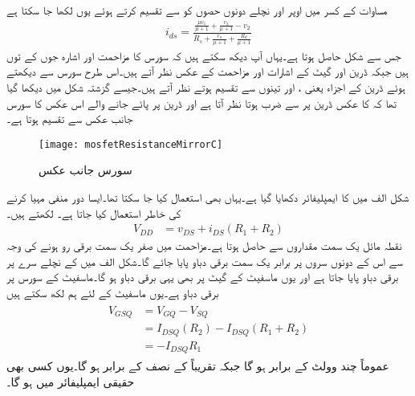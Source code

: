 مساوات  کے  کسر میں اوپر اور نچلے دونوں حصوں کو  سے تقسیم کرتے ہوئے یوں لکھا جا سکتا ہے
\begin{align}\label{مساوات_ماسفیٹ_محاصل_عکس_الف}
i_{ds}=\frac{\frac{\mu v_1}{\mu+1}+\frac{v_3}{\mu+1}- v_2}{R_s+\frac{r_o}{\mu+1}+\frac{R_d}{\mu+1}}
\end{align}
جس سے شکل  حاصل ہوتا ہے۔یہاں آپ دیکھ سکتے ہیں کہ سورس کا مزاحمت  اور اشارہ  جوں کے توں ہیں جبکہ ڈرین اور گیٹ کے اشارات اور مزاحمت کے عکس نظر آتے ہیں۔اس طرح سورس سے دیکھتے ہوئے ڈرین کے اجزاء یعنی ،  اور  تینوں  سے تقسیم ہوتے نظر آتے ہیں۔جیسے گزشتہ شکل میں دیکھا گیا تھا کہ  کا عکس ڈرین پر  سے ضرب ہوتا نظر آتا ہے اور ڈرین پر پائے جانے والے اس عکس کا سورس جانب عکس سے تقسیم ہوتا ہے۔
%
\begin{figure}
\centering
\texttt{[image: mosfetResistanceMirrorC]}
\caption{سورس جانب عکس}
\label{شکل_ماسفیٹ_مزاحمت_کے_عکس_پ}
\end{figure}
شکل  الف میں  کا  ایمپلیفائر دکھایا گیا ہے۔یہاں  بھی استعمال کیا جا سکتا تھا۔ایسا دور منفی  مہیا کرنے کی خاطر استعمال کیا جاتا ہے۔ لکھتے ہیں۔
\begin{align}\label{مساوات_ماسفیت_تابع_مخارج_بار_کا_خط}
V_{DD}&=v_{DS}+i_{DS} \left(R_1+R_2 \right)
\end{align}
نقطہ  مائل یک سمت مقداروں سے حاصل ہوتا ہے۔مزاحمت  میں صفر یک سمت برقی رو ہونے کی وجہ سے اس کے دونوں سروں پر برابر یک سمت برقی دباو پایا جائے گا۔شکل  الف میں  کے نچلے سرے پر  برقی دباو پایا جاتا ہے اور یوں ماسفیٹ کے گیٹ پر بھی یہی برقی دباو ہو گا۔ماسفیٹ کے سورس پر  برقی دباو ہے۔یوں ماسفیٹ کے لئے ہم لکھ سکتے ہیں
\begin{gather}
\begin{aligned}\label{مساوات_ماسفیت_تابع_مخارج_نقطہ _مائل}
V_{GSQ}&=V_{GQ}-V_{SQ}\\
&=I_{DSQ} \left( R_2\right)-I_{DSQ} \left(R_1+R_2 \right)\\
&=-I_{DSQ} R_1
\end{aligned}
\end{gather}
عموماً  چند وولٹ کے برابر ہو گا جبکہ  تقریباً  کے نصف کے برابر ہو گا۔یوں کسی بھی حقیقی ایمپلیفائر میں  ہو گا۔
